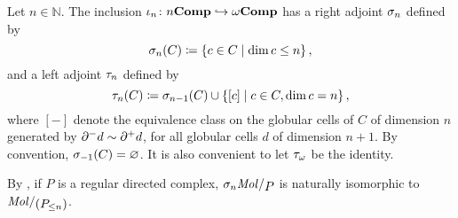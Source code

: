 \begin{dfn} 
    Let \( n \in \mathbb{N} \).
    The inclusion \( \iota_n \colon {n\mathbf{Comp}} \hookrightarrow \omega\mathbf{Comp} \) has a right adjoint \( \sigma_{n} \) defined by
    \begin{equation*}
        \sigma_{n}(C) \coloneqq \left\{ {c \in C \mid \dim c \le n} \right\},
    \end{equation*}
    and a left adjoint \( \tau_{n} \) defined by
    \begin{equation*}
        \tau_{n}(C) \coloneqq \sigma_{n - 1}(C) \cup \left\{ {[c] \mid c \in C, \dim c = n} \right\},
    \end{equation*}
    where \( [-] \) denote the equivalence class on the globular cells of \( C \) of dimension \( n \) generated by \( \partial_{}^{-} d \sim \partial_{}^{+} d \), for all globular cells \( d \) of dimension \( n + 1 \). 
    By convention, \( \sigma_{-1}(C) = \varnothing \).
    It is also convenient to let \( \tau_{\omega} \) be the identity.
\end{dfn}

\begin{rmk}
    By \cite[Proposition 5.2.14]{hadzihasanovic2024combinatorics}, if \( P \) is a regular directed complex, \( \skel{n} \molecin{P} \) is naturally isomorphic to \( \molecin{(\gr{\le n}P)} \).
\end{rmk}

